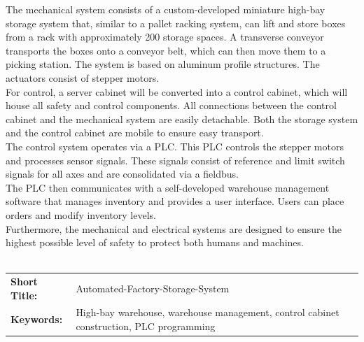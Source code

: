\documentclass[12pt, twoside]{article}
\begin{document}
The mechanical system consists of a custom-developed miniature high-bay storage system that, similar to a pallet racking system, can lift and store boxes from a rack with approximately 200 storage spaces. A transverse conveyor transports the boxes onto a conveyor belt, which can then move them to a picking station. The system is based on aluminum profile structures. The actuators consist of stepper motors.\\

For control, a server cabinet will be converted into a control cabinet, which will house all safety and control components. All connections between the control cabinet and the mechanical system are easily detachable. Both the storage system and the control cabinet are mobile to ensure easy transport.\\

The control system operates via a PLC. This PLC controls the stepper motors and processes sensor signals. These signals consist of reference and limit switch signals for all axes and are consolidated via a fieldbus. \\

The PLC then communicates with a self-developed warehouse management software that manages inventory and provides a user interface. Users can place orders and modify inventory levels.\\

Furthermore, the mechanical and electrical systems are designed to ensure the highest possible level of safety to protect both humans and machines.
\\\\
\bgroup
    \def\arraystretch{1.5}
    \begin{tabular}{p{48mm}p{113mm}}
        \textbf{Short Title:} & Automated-Factory-Storage-System\\
        \textbf{Keywords:} & High-bay warehouse, warehouse management, control cabinet construction, PLC programming
    \end{tabular}
\egroup



\newpage

\tableofcontents
\newpage


\newpage

\color{black}
\newpage
{}




\newpage
{}

\end{document}
